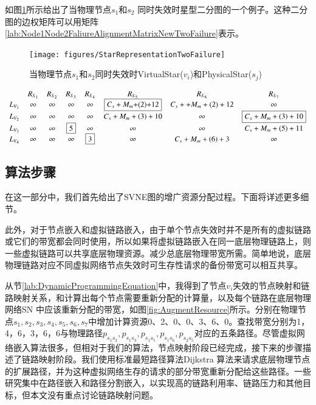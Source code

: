 \label{sec:multiplePhysicalNodeFailure}
如图\ref{fig:StarRepresentationTwoFailure}所示给出了当物理节点$s_1$和$s_2$ 同时失效时星型二分图的一个例子。这种二分图的边权矩阵可以用矩阵\ref{lab:Node1Node2FaliureAlignmentMatrixNewTwoFailure}表示。
\begin{figure}[htbp]
\centering
\texttt{[image: figures/StarRepresentationTwoFailure]}\\
  \caption{当物理节点$s_1$和$s_2$同时失效时VirtualStar($v_i$)和PhysicalStar($s_j$)}\label{fig:StarRepresentationTwoFailure}
\end{figure}
\begin{equation}
\small{
 {\begin{array}{*{20}{c}}
&R_{S_1}&R_{S_2}&R_{S_3}&R_{S_4}&R_{S_5}&R_{S_6}&R_{S_{7}}\\
{L_{V_1}}&\infty&\infty&\infty&\infty&\fbox{$C_{s}+M_{m}$+(2)+12}&C_{s}++M_{m}+(2)+12&\infty\\
L_{V_2}&\infty&\infty&\infty&\infty&C_{s}+M_{m}+(3)+10&\infty&\fbox{$C_{s}+M_{m}+(3)+10$}\\
L_{V_3}&\infty&\infty&\fbox{5}&\infty&\infty&\infty&C_{s}+M_{m}+(5)+11\\
L_{V_4}&\infty&\infty&\infty&\fbox{3}&\infty&C_{s}+M_{m}+(6)+3&\infty\\
\end{array}}
}
\label{lab:Node1Node2FaliureAlignmentMatrixNewTwoFailure}
\end{equation}
\subsection{算法步骤}
在这一部分中，我们首先给出了SVNE图的增广资源分配过程。下面将详述更多细节。

此外，对于节点嵌入和虚拟链路嵌入，由于单个节点失效时并不是所有的虚拟链路或它们的带宽都会同时使用，所以如果将虚拟链路嵌入在同一底层物理链路上，则一些虚拟链路可以共享底层物理资源。减少总底层物理带宽所需。简单地说，底层物理链路对应不同虚拟网络节点失效时可生存性请求的备份带宽可以相互共享。

从节\ref{lab:DynamicProgrammingEquation}中，我得到了节点$v_i$失效的节点映射和链路映射关系，和计算出每个节点需要重新分配的计算量，以及每个链路在底层物理网络SN 中应该重新分配的带宽，如图\ref{fig:AugmentResource}所示。分别在物理节点$s_1,s_2,s_3,s_4,s_5,s_6,s_7$中增加计算资源0、2、0、0、3、6、0。查找带宽分别为1，4，6，3，6，6与物理路径$p_{s_1s_2},p_{s_1s_3},p_{s_1s_5},p_{s_1s_6},p_{s_2s_5}$对应的五条路径。尽管虚拟网络嵌入算法很多，但相对于我们的算法，节点映射阶段已经完成，接下来的步骤描述了链路映射阶段。我们使用标准最短路径算法Dijkstra 算法\cite{skiena1990dijkstra}来请求底层物理节点的扩展路径，并为这种虚拟网络生存的请求的部分带宽重新分配给这些路径。一些研究\cite{yu2008rethinking}集中在路径嵌入和路径分割嵌入，以实现高的链路利用率、链路压力和其他目标，但本文没有重点讨论链路映射问题。

